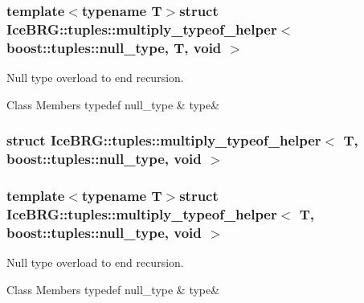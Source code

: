 \subsubsection*{template$<$typename T$>$struct Ice\+B\+R\+G\+::tuples\+::multiply\+\_\+typeof\+\_\+helper$<$ boost\+::tuples\+::null\+\_\+type, T, void $>$}

Null type overload to end recursion. \begin{DoxyFields}{Class Members}
\hypertarget{namespaceIceBRG_1_1tuples_a374ba5bed0de21d1567f5111293720ac}{}typedef null\+\_\+type\label{namespaceIceBRG_1_1tuples_a374ba5bed0de21d1567f5111293720ac}
&
type&
\\
\hline

\end{DoxyFields}
\label{structIceBRG_1_1tuples_1_1multiply__typeof__helper_3_01T_00_01boost_1_1tuples_1_1null__type_00_01void_01_4}
\hypertarget{namespaceIceBRG_1_1tuples_structIceBRG_1_1tuples_1_1multiply__typeof__helper_3_01T_00_01boost_1_1tuples_1_1null__type_00_01void_01_4}{}
\subsubsection{struct Ice\+B\+R\+G\+:\+:tuples\+:\+:multiply\+\_\+typeof\+\_\+helper$<$ T, boost\+:\+:tuples\+:\+:null\+\_\+type, void $>$}
\subsubsection*{template$<$typename T$>$struct Ice\+B\+R\+G\+::tuples\+::multiply\+\_\+typeof\+\_\+helper$<$ T, boost\+::tuples\+::null\+\_\+type, void $>$}

Null type overload to end recursion. \begin{DoxyFields}{Class Members}
\hypertarget{namespaceIceBRG_1_1tuples_a5105d0eef1d795e1a6213ed7c405592f}{}typedef null\+\_\+type\label{namespaceIceBRG_1_1tuples_a5105d0eef1d795e1a6213ed7c405592f}
&
type&
\\
\hline

\end{DoxyFields}
\label{structIceBRG_1_1tuples_1_1multiply__typeof__helper_3_01T1_00_01T2_00_01BRG__S__IS__TUPLE_07T1_081d8a4cfcf4cba4b6dba7b46ae822b392}
\hypertarget{namespaceIceBRG_1_1tuples_structIceBRG_1_1tuples_1_1multiply__typeof__helper_3_01T1_00_01T2_00_01BRG__S__IS__TUPLE_07T1_081d8a4cfcf4cba4b6dba7b46ae822b392}{}
